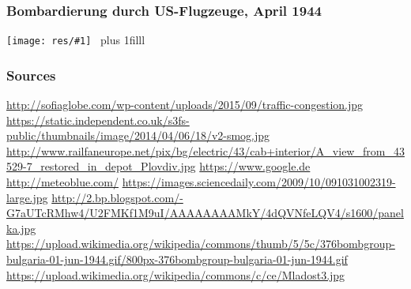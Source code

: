 \documentclass[t]{beamer} %
\newcommand{\toBottom}{\vskip0pt plus 1filll}
\newenvironment{newWords}
               {\toBottom \begin{block}{} \begin{tiny}}
               {\end{tiny} \end{block}}
\newcommand{\bigPic} [1] {\noindent \texttt{[image: res/\#1]}~}
\begin{document}
\begin{frame}
\frametitle{Bombardierung durch US-Flugzeuge, April 1944}
\bigPic{bombing}
\begin{newWords}
\end{newWords}
\end{frame}

\begin{frame}
\frametitle{Sources}
\begin{tiny}
\url{http://sofiaglobe.com/wp-content/uploads/2015/09/traffic-congestion.jpg}
\url{https://static.independent.co.uk/s3fs-public/thumbnails/image/2014/04/06/18/v2-smog.jpg}
\url{http://www.railfaneurope.net/pix/bg/electric/43/cab+interior/A_view_from_43529-7_restored_in_depot_Plovdiv.jpg}
\url{https://www.google.de}
\url{http://meteoblue.com/}
\url{https://images.sciencedaily.com/2009/10/091031002319-large.jpg}
\url{http://2.bp.blogspot.com/-G7aUTcRMhw4/U2FMKf1M9uI/AAAAAAAAMkY/4dQVNfeLQV4/s1600/panelka.jpg}
\url{https://upload.wikimedia.org/wikipedia/commons/thumb/5/5c/376bombgroup-bulgaria-01-jun-1944.gif/800px-376bombgroup-bulgaria-01-jun-1944.gif}
\url{https://upload.wikimedia.org/wikipedia/commons/c/ce/Mladost3.jpg}
\end{tiny}
\end{frame}
\end{document}
